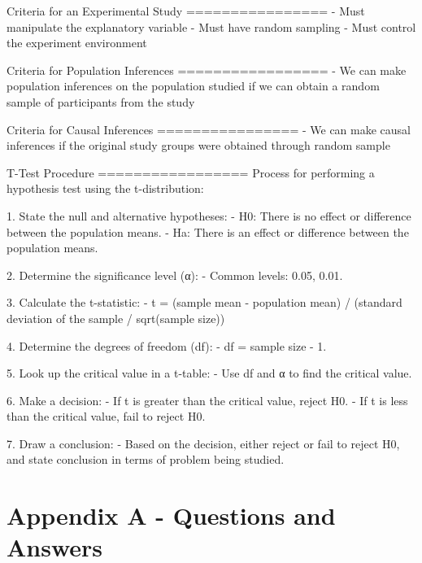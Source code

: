 \documentclass{article}
\title{\titletext}
\author{\authortext}
\theoremstyle{plain}
\theoremstyle{definition}
\theoremstyle{definition}
\begin{document}
\begin{markdown}
Criteria for an Experimental Study
================
- Must manipulate the explanatory variable
- Must have random sampling
- Must control the experiment environment

Criteria for Population Inferences
=================
- We can make population inferences on the population studied if we can obtain a random sample of participants from the study

Criteria for Causal Inferences
================
- We can make causal inferences if the original study groups were obtained through random sample

T-Test Procedure
=================
Process for performing a hypothesis test using the t-distribution:

1. State the null and alternative hypotheses: 
    - H0: There is no effect or difference between the population means. 
    - Ha: There is an effect or difference between the population means. 

2. Determine the significance level (α): 
    - Common levels: 0.05, 0.01.

3. Calculate the t-statistic: 
    - t = (sample mean - population mean) / (standard deviation of the sample / sqrt(sample size))

4. Determine the degrees of freedom (df): 
    - df = sample size - 1.

5. Look up the critical value in a t-table: 
    - Use df and α to find the critical value.

6. Make a decision: 
    - If t is greater than the critical value, reject H0. 
    - If t is less than the critical value, fail to reject H0.

7. Draw a conclusion: 
    - Based on the decision, either reject or fail to reject H0, and state conclusion in terms of problem being studied.

\end{markdown}

\section{Appendix A - Questions and Answers}
\end{document}
